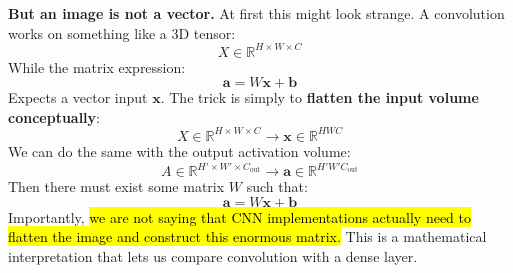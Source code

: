\highspace
\textcolor{Green3}{ \textbf{But an image is not a vector.}} At first this might look strange. A convolution works on something like a 3D tensor:
\begin{equation*}
    X \in \mathbb{R}^{H \times W \times C}
\end{equation*}
While the matrix expression:
\begin{equation*}
    \mathbf{a} = W\mathbf{x} + \mathbf{b}
\end{equation*}
Expects a vector input $\mathbf{x}$. The trick is simply to \textbf{flatten the input volume conceptually}:
\begin{equation*}
    X \in \mathbb{R}^{H \times W \times C} \longrightarrow \mathbf{x} \in \mathbb{R}^{HWC}
\end{equation*}
We can do the same with the output activation volume:
\begin{equation*}
    A \in \mathbb{R}^{H' \times W' \times C_{\text{out}}} \longrightarrow \mathbf{a} \in \mathbb{R}^{H'W'C_{\text{out}}}
\end{equation*}
Then there must exist some matrix $W$ such that:
\begin{equation*}
    \mathbf{a} = W\mathbf{x} + \mathbf{b}
\end{equation*}
Importantly, \hl{we are not saying that CNN implementations actually need to flatten the image and construct this enormous matrix.} This is a mathematical interpretation that lets us compare convolution with a dense layer.

